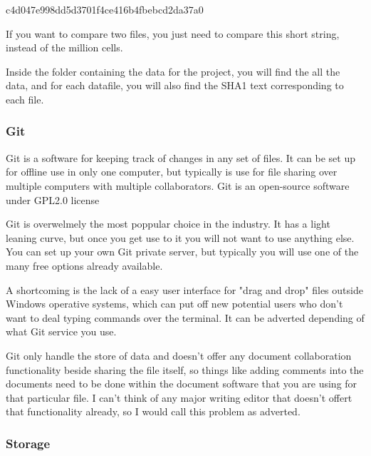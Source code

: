 c4d047e998dd5d3701f4ce416b4fbebcd2da37a0  \vspace{3 mm}

If you want to compare two files, you just need to compare this short string, instead of the million cells.\vspace{3 mm}

Inside the folder containing the data for the project, you will find the all the data, and for each datafile, you will also find the SHA1 text corresponding to each file.\vspace{3 mm}

\subsubsection{Git}

Git is a software for keeping track of changes in any set of files. It can be set up for offline use in only one computer, but typically is use for file sharing over multiple computers with multiple collaborators. Git is an open-source software under GPL2.0 license\vspace{3 mm}

Git is overwelmely the most poppular choice in the industry. It has a light leaning curve, but once you get use to it you will not want to use anything else. You can set up your own Git private server, but typically you will use one of the many free options already available.\vspace{3 mm}

A shortcoming is the lack of a easy user interface for "drag and drop" files outside Windows operative systems, which can put off new potential users who don't want to deal typing commands over the terminal. It can be adverted depending of what Git service you use.\vspace{3 mm}

Git only handle the store of data and doesn't offer any document collaboration functionality beside sharing the file itself, so things like adding comments into the documents need to be done within the document software that you are using for that particular file. I can't think of any major writing editor that doesn't offert that functionality already, so I would call this problem as adverted.\vspace{3 mm}


\subsubsection{Storage}

